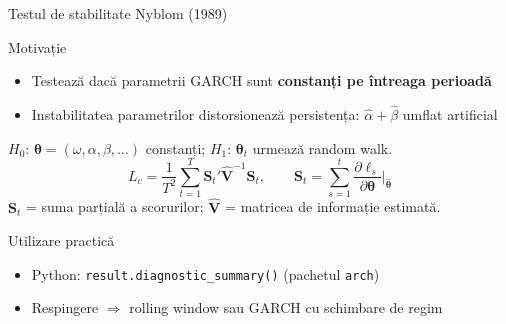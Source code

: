\documentclass[9pt, aspectratio=169, t]{beamer}
\begin{document}
\begin{frame}{Testul de stabilitate Nyblom (1989)}
    \small
        \begin{block}{Motivație}
            \begin{itemize}
                \item Testează dacă parametrii GARCH sunt \textbf{constanți pe întreaga perioadă}
                \item Instabilitatea parametrilor distorsionează persistența: $\hat{\alpha} + \hat{\beta}$ umflat artificial
            \end{itemize}
        \end{block}
        \vspace{-1mm}
        \begin{defn}
            $H_0$: $\boldsymbol{\theta} = (\omega, \alpha, \beta, \ldots)$ constanți; $H_1$: $\boldsymbol{\theta}_t$ urmează random walk.
            \vspace{-2mm}
            \[
                L_c = \frac{1}{T^2} \sum_{t=1}^T \mathbf{S}_t' \hat{\mathbf{V}}^{-1} \mathbf{S}_t, \qquad \mathbf{S}_t = \sum_{s=1}^t \frac{\partial \ell_s}{\partial \boldsymbol{\theta}}\bigg|_{\hat{\boldsymbol{\theta}}}
            \]
            \vspace{-2mm}
            $\mathbf{S}_t$ = suma parțială a scorurilor; $\hat{\mathbf{V}}$ = matricea de informație estimată.
        \end{defn}
        \vspace{-1mm}
        \begin{alertblock}{Utilizare practică}
            \begin{itemize}
                \item Python: \texttt{result.diagnostic\_summary()} (pachetul \texttt{arch})
                \item Respingere $\Rightarrow$ rolling window sau GARCH cu schimbare de regim
            \end{itemize}
        \end{alertblock}
\end{frame}
\end{document}
